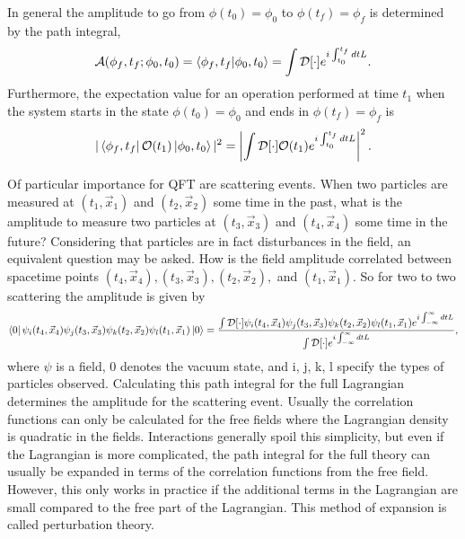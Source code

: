 In general the amplitude to go from $\phi(t_0) = \phi_0$ to $\phi(t_f) = \phi_f$ is determined by the path integral, 
%
\begin{equation}
\mathcal{A}(\phi_f, t_f; \phi_0, t_0) = \braket{\phi_f,t_f|\phi_0,t_0} = \int \mathcal{D}[\cdot] e^{i\int_{t_0}^{t_f} dt L}.
\end{equation}
Furthermore, the expectation value for an operation performed at time $t_1$ when the system starts in the state $\phi(t_0) = \phi_0$ and ends in $\phi(t_f) = \phi_f$ is
%
\begin{equation}
|\bra{\phi_f,t_f}\mathcal{O}(t_1)\ket{\phi_0,t_0}|^2 = \left|\int \mathcal{D}[\cdot] \mathcal{O}(t_1) e^{i\int_{t_0}^{t_f} dt L}\right|^2.
\end{equation}

Of particular importance for QFT are scattering events. When two particles are measured at $(t_1,\vec{x}_1)$ and $(t_2,\vec{x}_2)$ some time in the past, what is the amplitude to measure two particles at $(t_3,\vec{x}_3)$ and $(t_4,\vec{x}_4)$ some time in the future? Considering that particles are in fact disturbances in the field, an equivalent question may be asked. How is the field amplitude correlated between spacetime points $(t_4, \vec{x}_4), (t_3, \vec{x}_3), (t_2, \vec{x}_2),$ and $(t_1, \vec{x}_1)$. So for two to two scattering the amplitude is given by
%
\begin{equation}
\bra{0}\psi_i(t_4,\vec{x}_4)\psi_j(t_3,\vec{x}_3)\psi_k(t_2,\vec{x}_2)\psi_l(t_1,\vec{x}_1)\ket{0} = 
\frac{\int \mathcal{D}[\cdot]\psi_i(t_4,\vec{x}_4)\psi_j(t_3,\vec{x}_3)\psi_k(t_2,\vec{x}_2)\psi_l(t_1,\vec{x}_1)
e^{i\int_{-\infty}^{\infty} dt L}}{\int \mathcal{D}[\cdot]e^{i\int_{-\infty}^{\infty} dt L}},
\end{equation}
where $\psi$ is a field, 0 denotes the vacuum state, and i, j, k, l specify the types of particles observed. Calculating this path integral for the full Lagrangian determines the amplitude for the scattering event. Usually the correlation functions can only be calculated for the free fields where the Lagrangian density is quadratic in the fields. Interactions generally spoil this simplicity, but even if the Lagrangian is more complicated, the path integral for the full theory can usually be expanded in terms of the correlation functions from the free field. However, this only works in practice if the additional terms in the Lagrangian are small compared to the free part of the Lagrangian. This method of expansion is called perturbation theory.     

